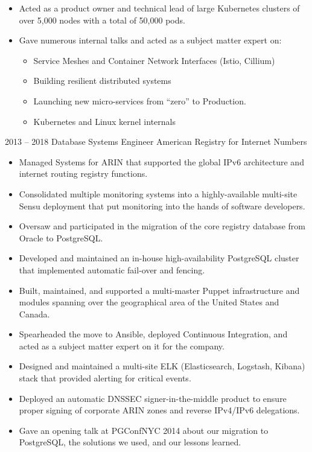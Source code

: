\documentclass[9pt]{developercv}
\begin{document}
\begin{entrylist}
{\begin{itemize}
			\item Acted as a product owner and technical lead of large Kubernetes clusters of over 5,000 nodes with a total of 50,000 pods.
			\item Gave numerous internal talks and acted as a subject matter expert on:
				  \begin{itemize}
					\item Service Meshes and Container Network Interfaces (Istio, Cillium)
					\item Building resilient distributed systems
					\item Launching new micro-services from ``zero'' to Production.
					\item Kubernetes and Linux kernel internals
				  \end{itemize}
		  \end{itemize}
		}
	\entry
		{2013 -- 2018}
		{Database Systems Engineer}
		{American Registry for Internet Numbers}
		{
		  \begin{itemize}
			\item Managed Systems for ARIN that supported the global IPv6 architecture and internet routing registry functions.
			\item Consolidated multiple monitoring systems into a highly-available multi-site Sensu deployment that put monitoring into the hands of software developers.
			\item Oversaw and participated in the migration of the core registry database from Oracle to PostgreSQL.
			\item Developed and maintained an in-house high-availability PostgreSQL cluster that implemented automatic fail-over and fencing.
			\item Built, maintained, and supported a multi-master Puppet infrastructure and modules spanning over the geographical area of the United States and Canada.
			\item Spearheaded the move to Ansible, deployed Continuous Integration, and acted as a subject matter expert on it for the company.
			\item Designed and maintained a multi-site ELK (Elasticsearch, Logstash, Kibana) stack that provided alerting for critical events.
			\item Deployed an automatic DNSSEC signer-in-the-middle product to ensure proper signing of corporate ARIN zones and reverse IPv4/IPv6 delegations.
			\item Gave an opening talk at PGConfNYC 2014 about our migration to PostgreSQL, the solutions we used, and our lessons learned.

\end{itemize}}
\end{entrylist}
\end{document}
